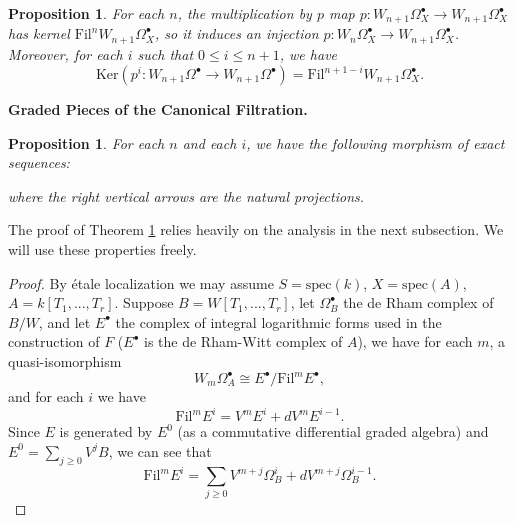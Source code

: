 \documentclass[a4paper,12pt,twoside]{report}
\newtheorem{proposition}[theorem]{Proposition}
\newcommand{\Fil}{\mathrm{Fil}}
\newcommand{\spec}{\mathrm{spec}}
\newcommand{\Ker}{\mathrm{Ker}}
\begin{document}
\begin{appendices}
    \begin{proposition}\label{kerP}
        For each $n$, the multiplication by $p$ map 
        $p: W_{n+1}\Omega_X^\bullet\rightarrow W_{n+1}\Omega_X^\bullet$ has kernel $\Fil^n W_{n+1}\Omega_X^{\bullet}$, 
        so it induces an injection
        $p: W_n\Omega_X^\bullet\rightarrow W_{n+1}\Omega_X^\bullet$. 
        Moreover, for each $i$ such that $0\leqslant i\leqslant n+1$, we have 
        \[\Ker(p^i: W_{n+1}\Omega^\bullet\rightarrow W_{n+1}\Omega^\bullet)=\Fil^{n+1-i}W_{n+1}\Omega_X^\bullet.\]
    \end{proposition}
    
    \medskip
    
    {\bf Graded Pieces of the Canonical Filtration.}
    
    \begin{proposition}\label{kerVndVn}
        For each $n$ and each $i$, we have the following morphism of exact sequences:
        \begin{center}
        \end{center}
        \begin{center}
        \end{center}
        where the right vertical arrows are the natural projections. 
    \end{proposition}

    The proof of Theorem \ref{kerVndVn} relies heavily on the analysis in the next subsection. We will use these properties freely. 
    
    \begin{proof}
         By \'etale localization we may assume $S=\spec(k)$, $X=\spec(A)$, $A=k[T_1,...,T_r]$. 
    Suppose $B=W[T_1,...,T_r]$, let $\Omega_B^\bullet$ the de Rham complex of $B/W$, 
    and let $E^\bullet$ the complex of integral logarithmic forms used in the construction of $F$ 
    ($E^\bullet$ is the de Rham-Witt complex of $A$), we have for each $m$, a quasi-isomorphism 
    \[W_m\Omega_A^\bullet\cong E^\bullet/\Fil^m E^\bullet,\]
    and for each $i$ we have
    \[\Fil^mE^i=V^mE^i+dV^mE^{i-1}.\]
    Since $E$ is generated by $E^0$ (as a commutative differential graded algebra) 
    and $E^0=\sum_{j\geqslant 0}V^jB$, we can see that 
    \[\Fil^mE^i=\sum_{j\geqslant0} V^{m+j}\Omega_B^i+dV^{m+j}\Omega_B^{i-1}.\]
    

\end{proof}
\end{appendices}
\end{document}
